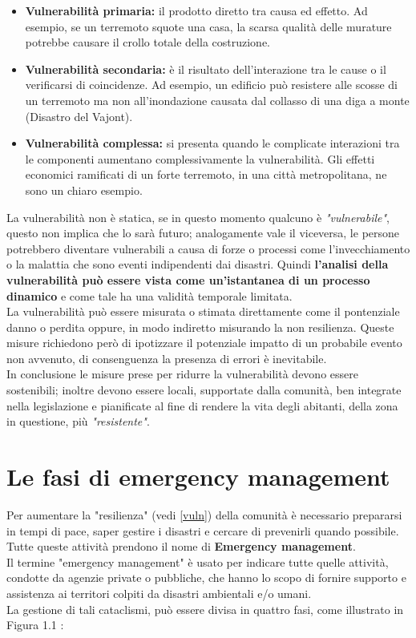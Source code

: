  \begin{itemize}
 \item \textbf{Vulnerabilità primaria:} il prodotto diretto tra causa ed effetto. Ad esempio, se un terremoto squote una casa, la scarsa qualità delle murature potrebbe causare il crollo totale della costruzione.
 \item \textbf{Vulnerabilità secondaria:} è il risultato dell'interazione tra le cause o il verificarsi di coincidenze. Ad esempio, un edificio può resistere alle scosse di un terremoto ma non all'inondazione causata dal collasso di una diga a monte (Disastro del Vajont).
 \item \textbf{Vulnerabilità complessa:} si presenta quando le complicate interazioni tra le componenti aumentano complessivamente la vulnerabilità. Gli effetti economici ramificati di un forte terremoto, in una città metropolitana, ne sono un chiaro esempio.
 \end{itemize}
 La vulnerabilità non è statica, se in questo momento qualcuno è \textit{"vulnerabile"}, questo non implica che lo sarà futuro; analogamente vale il viceversa, le persone potrebbero diventare vulnerabili a causa di forze o processi come l'invecchiamento o la malattia che sono eventi indipendenti dai disastri. Quindi \textbf{l'analisi della vulnerabilità può essere vista come un'istantanea di un processo dinamico} e come tale ha una validità temporale limitata. \\
La vulnerabilità può essere misurata o stimata direttamente come il pontenziale danno o perdita oppure, in modo indiretto misurando la non resilienza. Queste misure richiedono però di ipotizzare il potenziale impatto di un probabile evento non avvenuto, di consenguenza la presenza di errori è inevitabile. \\
In conclusione le misure prese per ridurre la vulnerabilità devono essere sostenibili; inoltre devono essere locali, supportate dalla comunità, ben integrate nella legislazione e pianificate al fine di rendere la vita degli abitanti, della zona in questione, più \textit{"resistente"}. \newpage



\section{Le fasi di emergency management}
\label{fasi}
Per aumentare la "resilienza" (vedi \ref{vuln}) della comunità è necessario prepararsi in tempi di pace, saper gestire i disastri e cercare di prevenirli quando possibile. Tutte queste attività prendono il nome di \textbf{Emergency management}.	\\
Il termine "emergency management" è usato per indicare tutte quelle attività, condotte da agenzie private o pubbliche, che hanno lo scopo di fornire supporto e assistenza ai territori colpiti da disastri ambientali e/o umani. \\
La gestione di tali cataclismi, può essere divisa in quattro fasi, come illustrato in Figura 1.1 :


